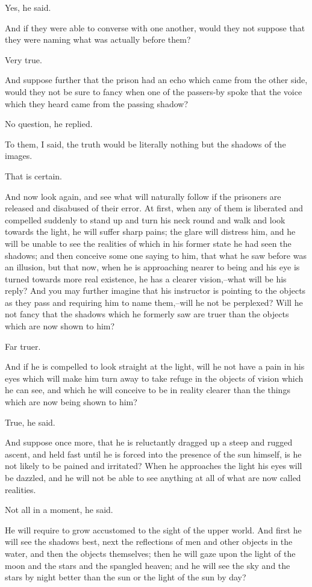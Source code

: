 Yes, he said.

And if they were able to converse with one another, would they not
suppose that they were naming what was actually before them?

Very true.

And suppose further that the prison had an echo which came from the
other side, would they not be sure to fancy when one of the passers-by
spoke that the voice which they heard came from the passing shadow?

No question, he replied.

To them, I said, the truth would be literally nothing but the shadows of
the images.

That is certain.

And now look again, and see what will naturally follow if the prisoners
are released and disabused of their error. At first, when any of them is
liberated and compelled suddenly to stand up and turn his neck round and
walk and look towards the light, he will suffer sharp pains; the glare
will distress him, and he will be unable to see the realities of which
in his former state he had seen the shadows; and then conceive some one
saying to him, that what he saw before was an illusion, but that now,
when he is approaching nearer to being and his eye is turned towards
more real existence, he has a clearer vision,--what will be his reply?
And you may further imagine that his instructor is pointing to the
objects as they pass and requiring him to name them,--will he not be
perplexed? Will he not fancy that the shadows which he formerly saw are
truer than the objects which are now shown to him?

Far truer.

And if he is compelled to look straight at the light, will he not have
a pain in his eyes which will make him turn away to take refuge in the
objects of vision which he can see, and which he will conceive to be in
reality clearer than the things which are now being shown to him?

True, he said.

And suppose once more, that he is reluctantly dragged up a steep and
rugged ascent, and held fast until he is forced into the presence of
the sun himself, is he not likely to be pained and irritated? When he
approaches the light his eyes will be dazzled, and he will not be able
to see anything at all of what are now called realities.

Not all in a moment, he said.

He will require to grow accustomed to the sight of the upper world.
And first he will see the shadows best, next the reflections of men and
other objects in the water, and then the objects themselves; then he
will gaze upon the light of the moon and the stars and the spangled
heaven; and he will see the sky and the stars by night better than the
sun or the light of the sun by day?

